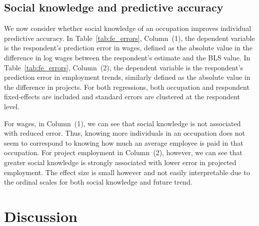 \documentclass[12pt]{article}
\begin{document}


\subsection{Social knowledge and predictive accuracy}

We now consider whether social knowledge of an occupation improves individual predictive accuracy. 
In Table~\ref{tab:fe_errors}, Column~(1), the dependent variable is the respondent's prediction error in wages, defined as the absolute value in the difference in log wages between the respondent's estimate and the BLS value.  
In Table~\ref{tab:fe_errors}, Column~(2), the dependent variable is the respondent's prediction error in employment trends, similarly defined as the absolute value in the difference in projects. 
For both regressions, both occupation and respondent fixed-effects are included and standard errors are clustered at the respondent level.  



For wages, in Column~(1), we can see that social knowledge is not associated with reduced error. Thus, knowing more individuals in an occupation does not seem to correspond to knowing how much an average employee is paid in that occupation.
For project employment in Column~(2), however, we can see that greater social knowledge is strongly associated with lower error in projected employment. The effect size is small however and not easily interpretable due to the ordinal scales for both social knowledge and future trend.

\section{Discussion}
\end{document}
